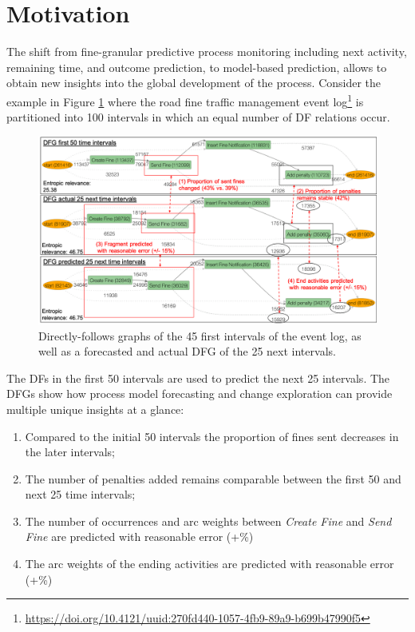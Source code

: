 \section{Motivation}\label{sec:2:motivation}

The shift from fine-granular predictive process monitoring including next activity, remaining time, and outcome prediction, to model-based prediction, allows to obtain new insights into the global development of the process.
Consider the example in Figure \ref{fig:dfg_example_intro} where the road fine traffic management event log\footnote{\url{https://doi.org/10.4121/uuid:270fd440-1057-4fb9-89a9-b699b47990f5}} is partitioned into 100 intervals in which an equal number of DF relations occur.
\begin{figure}
    \centering
    \includegraphics[width=\textwidth]{img/MotExample.png}
    \caption{Directly-follows graphs of the 45 first intervals of the event log, as well as a forecasted and actual DFG of the 25 next intervals.}
    \label{fig:dfg_example_intro}
\end{figure}
The DFs in the first 50 intervals are used to predict the next 25 intervals.
The DFGs show how process model forecasting and change exploration can provide multiple unique insights at a glance:
\begin{enumerate}
    \item Compared to the initial 50 intervals the proportion of fines sent decreases in the later intervals;
    \item The number of penalties added remains comparable between the first 50 and next 25 time intervals;
    \item The number of occurrences and arc weights between \emph{Create Fine} and \emph{Send Fine} are predicted with reasonable error (+\%)
    \item The arc weights of the ending activities are predicted with reasonable error (+\%)
\end{enumerate}
